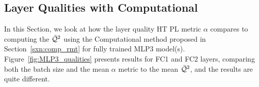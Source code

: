 \subsection{Layer Qualities with Computational \RTransforms}
\label{sxn:empirical_comp_r_transforms}

In this Section, we look at how the \HTSR layer quality HT PL metric $\alpha$
compares to computing the \LayerQualitySquared $\bar{\mathcal{Q}}^{2}$ using
the Computational \RTransform method proposed in Section~\ref{sxn:comp_rmt}
for fully trained MLP3 model(s).
Figure~\ref{fig:MLP3_qualities}
presents results for FC1 and FC2 layers, comparing
both the batch size and the mean $\alpha$ metric to the
mean $\bar{\mathcal{Q}}^{2}$, and the results are quite different.


\begin{figure}[ht]
    \centering
    \hspace{1cm} %
    \hspace{1cm} %
\end{figure}
